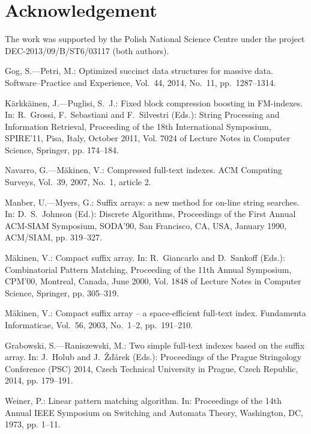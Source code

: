 \documentclass{cai}
\begin{document}
\section{Acknowledgement}

The work was supported by the Polish National Science Centre under the project DEC-2013/09/B/ST6/03117 (both authors).



\begin{thebibliography}{99}

Gog, S.---Petri, M.: Optimized succinct data structures for massive data.
  Software--Practice and Experience, Vol.~44, 2014, No.~11, pp.~1287--1314.

K{\"a}rkk{\"a}inen, J.---Puglisi, S.~J.: Fixed block compression boosting in {FM}-indexes. 
  In: R.~Grossi, F.~Sebastiani and F.~Silvestri (Eds.): 
  String Processing and Information Retrieval, 
  Proceeding of the 18th International Symposium, SPIRE'11, Pisa, Italy, October 2011,
  Vol. 7024 of Lecture Notes in Computer Science, Springer, pp. 174--184.

Navarro, G.---M{\"a}kinen, V.: Compressed full-text indexes. ACM Computing Surveys, Vol.~39, 2007, No.~1, article 2.

Manber, U.---Myers, G.: Suffix arrays: a new method for on-line string searches.
  In: D.~S.~Johnson (Ed.):
  Discrete Algorithms,
  Proceedings of the First Annual ACM-SIAM Symposium, SODA'90, San Francisco, CA, USA, January 1990,
  ACM/SIAM, pp. 319--327.

M{\"a}kinen, V.: Compact suffix array. 
  In: R.~Giancarlo and D.~Sankoff (Eds.): 
  Combinatorial Pattern Matching,
  Proceeding of the 11th Annual Symposium, CPM'00, Montreal, Canada, June 2000,
  Vol. 1848 of Lecture Notes in Computer Science, Springer, pp. 305--319.

M{\"a}kinen, V.: Compact suffix array -- a space-efficient full-text index.
  Fundamenta Informaticae, Vol.~56, 2003, No.~1--2, pp.~191--210.

Grabowski, S.---Raniszewski, M.: Two simple full-text indexes based on the suffix
  array. 
  In: J.~Holub and J.~{\v{Z}}{\v{d}}{\'{a}}rek (Eds.): Proceedings of the
  Prague Stringology Conference (PSC) 2014, Czech Technical University in
  Prague, Czech Republic, 2014, pp. 179--191.

Weiner, P.: Linear pattern matching algorithm.
  In: Proceedings of the 14th
  Annual IEEE Symposium on Switching and Automata Theory, Washington, DC, 1973,
  pp. 1--11.


\end{thebibliography}
\end{document}
